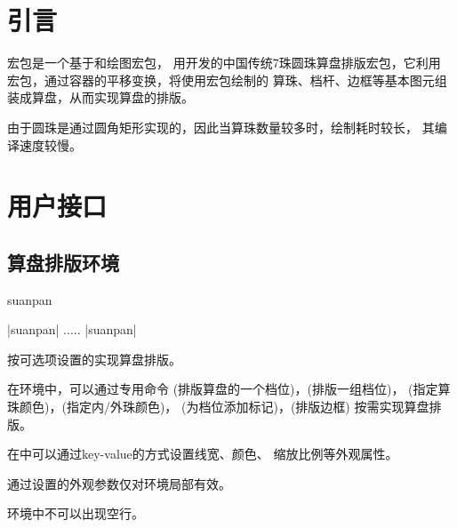 \documentclass[full]{l3doc}
\begin{document}
\begin{documentation}

\section{引言}

宏包是一个基于和绘图宏包，
用开发的中国传统7珠圆珠算盘排版宏包，它利用%
宏包，通过容器的平移变换，将使用宏包绘制的
算珠、档杆、边框等基本图元组装成算盘，从而实现算盘的排版。

由于圆珠是通过圆角矩形实现的，因此当算珠数量较多时，绘制耗时较长，
其编译速度较慢。

\section{用户接口}

\subsection{算盘排版环境}

\begin{function}{suanpan}
  \begin{syntax}
    |{suanpan}|
    .....
    |{suanpan}|
  \end{syntax}
\end{function}

  按可选项设置的实现算盘排版。

  在环境中，可以通过专用命令%
  (排版算盘的一个档位)，(排版一组档位)，
  (指定算珠颜色)，(指定内/外珠颜色)，
  (为档位添加标记)，(排版边框)
  按需实现算盘排版。

  在中可以通过key-value的方式设置线宽、颜色、
  缩放比例等外观属性。

  通过设置的外观参数仅对环境局部有效。

  \begin{notezh}
    环境中\textsf{不可以出现空行}。
  \end{notezh}

\begin{SideBySideExample}[frame=single,numbers=left,%
    xrightmargin=.48\linewidth,gobble=2]
  \centering
  \begin{suanpan}
  \end{suanpan}
\end{SideBySideExample}


\end{documentation}
\end{document}
